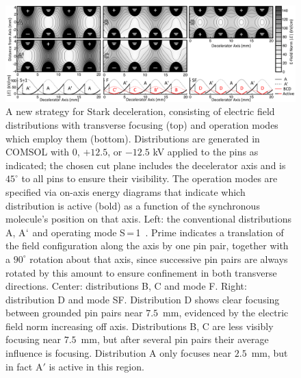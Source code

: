 \documentclass[%
 reprint,
 amsmath,amssymb,
 aps,
prl,
]{revtex4-1}
\begin{document}
\begin{figure}[t!]
\includegraphics[width=\linewidth]{Configurations/pinpairformal5.png}%
\vspace{-2mm}
\caption{
A new strategy for Stark deceleration, consisting of electric field distributions with transverse focusing (top) and operation modes which employ them (bottom). 
Distributions are generated in COMSOL with $0$, $+12.5$, or $-12.5$ kV applied to the pins as indicated; the chosen cut plane includes the decelerator axis and is $45^\circ$ to all pins to ensure their visibility.
The operation modes are specified via on-axis energy diagrams that indicate which distribution is active (bold) as a function of the synchronous molecule's position on that axis.
Left: the conventional distributions A, A$`$ and operating mode S\,=\,1~\cite{VanDeMeerakker2005a}.
Prime indicates a translation of the field configuration along the axis by one pin pair, together with a $90^\circ$ rotation about that axis, since successive pin pairs are always rotated by this amount to ensure confinement in both transverse directions.
Center: distributions B, C and mode F.
Right: distribution D and mode SF.
Distribution D shows clear focusing between grounded pin pairs near $7.5$~mm, evidenced by the electric field norm increasing off axis.
Distributions B, C are less visibly focusing near $7.5$~mm, but after several pin pairs their average influence is focusing.
Distribution A only focuses near $2.5$~mm, but in fact A$'$ is active in this region.
\vspace{-4mm}
}
\label{fig:chargecartoon}
\end{figure}
\end{document}
